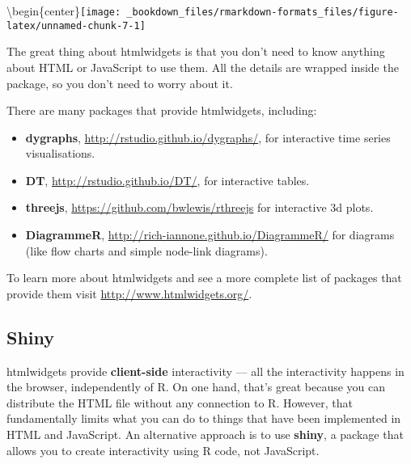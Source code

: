 \documentclass[]{book}
\newenvironment{Shaded}{\begin{snugshade}}{\end{snugshade}}
\newcommand{\KeywordTok}[1]{\textcolor[rgb]{0.13,0.29,0.53}{\textbf{{#1}}}}
\newcommand{\DataTypeTok}[1]{\textcolor[rgb]{0.13,0.29,0.53}{{#1}}}
\newcommand{\DecValTok}[1]{\textcolor[rgb]{0.00,0.00,0.81}{{#1}}}
\newcommand{\FloatTok}[1]{\textcolor[rgb]{0.00,0.00,0.81}{{#1}}}
\newcommand{\StringTok}[1]{\textcolor[rgb]{0.31,0.60,0.02}{{#1}}}
\newcommand{\NormalTok}[1]{{#1}}
\begin{document}
\begin{Shaded}
\end{Shaded}

\textbackslash{}begin\{center\}\texttt{[image: \_bookdown\_files/rmarkdown-formats\_files/figure-latex/unnamed-chunk-7-1]}

The great thing about htmlwidgets is that you don't need to know
anything about HTML or JavaScript to use them. All the details are
wrapped inside the package, so you don't need to worry about it.

There are many packages that provide htmlwidgets, including:

\begin{itemize}
\item
  \textbf{dygraphs}, \url{http://rstudio.github.io/dygraphs/}, for
  interactive time series visualisations.
\item
  \textbf{DT}, \url{http://rstudio.github.io/DT/}, for interactive
  tables.
\item
  \textbf{threejs}, \url{https://github.com/bwlewis/rthreejs} for
  interactive 3d plots.
\item
  \textbf{DiagrammeR}, \url{http://rich-iannone.github.io/DiagrammeR/}
  for diagrams (like flow charts and simple node-link diagrams).
\end{itemize}

To learn more about htmlwidgets and see a more complete list of packages
that provide them visit \url{http://www.htmlwidgets.org/}.

\subsection{Shiny}\label{shiny}

htmlwidgets provide \textbf{client-side} interactivity --- all the
interactivity happens in the browser, independently of R. On one hand,
that's great because you can distribute the HTML file without any
connection to R. However, that fundamentally limits what you can do to
things that have been implemented in HTML and JavaScript. An alternative
approach is to use \textbf{shiny}, a package that allows you to create
interactivity using R code, not JavaScript.
\end{document}

